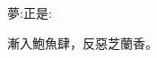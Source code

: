 \begin{parag}
    \begin{note}夢:正是:\end{note}
\end{parag}


\begin{parag}
    \begin{note}漸入鮑魚肆，反惡芝蘭香。\end{note}
\end{parag}

